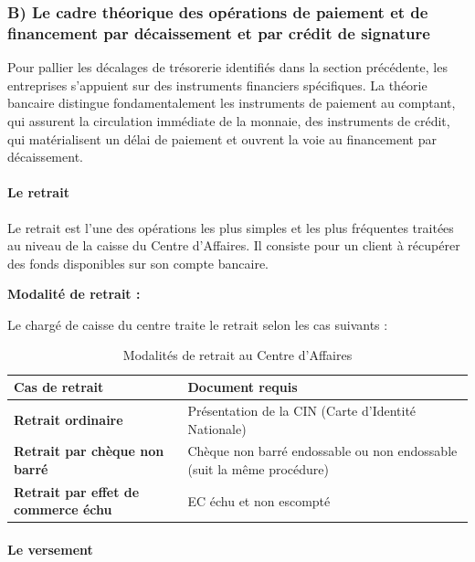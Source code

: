 \documentclass[12pt,a4paper]{report}
\begin{document}
\subsubsection*{B) Le cadre théorique des opérations de paiement et de financement par décaissement et par crédit de signature}

Pour pallier les décalages de trésorerie identifiés dans la section précédente, les entreprises s'appuient sur des instruments financiers spécifiques. La théorie bancaire distingue fondamentalement les instruments de paiement au comptant, qui assurent la circulation immédiate de la monnaie, des instruments de crédit, qui matérialisent un délai de paiement et ouvrent la voie au financement par décaissement.

\paragraph{Le retrait}

Le retrait est l'une des opérations les plus simples et les plus fréquentes traitées au niveau de la caisse du Centre d'Affaires. Il consiste pour un client à récupérer des fonds disponibles sur son compte bancaire.

\medskip
\textbf{Modalité de retrait :}

Le chargé de caisse du centre traite le retrait selon les cas suivants :

\begin{table}[h!]
\centering
\begin{tabularx}{\textwidth}{>{\bfseries}X X}
\toprule
Cas de retrait & Document requis \\
\midrule
Retrait ordinaire & Présentation de la CIN (Carte d'Identité Nationale) \\
\addlinespace
Retrait par chèque non barré & Chèque non barré endossable ou non endossable (suit la même procédure) \\
\addlinespace
Retrait par effet de commerce échu & EC échu et non escompté \\
\bottomrule
\end{tabularx}
\caption{Modalités de retrait au Centre d'Affaires}
\end{table}

\paragraph{Le versement}
\end{document}
